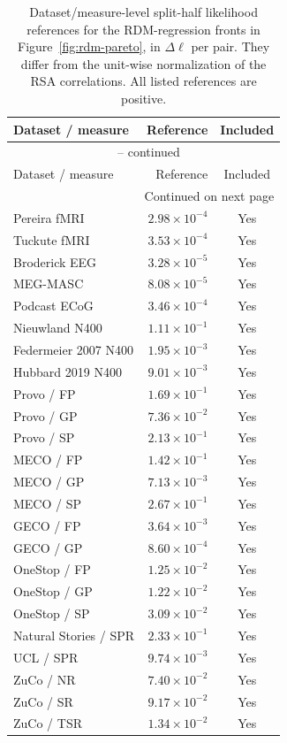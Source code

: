 {\small\setlength{\tabcolsep}{4pt}
\begin{longtable}{@{}lrc@{}}
\caption{Dataset/measure-level split-half likelihood references for the RDM-regression fronts in Figure~\ref{fig:rdm-pareto}, in $\Delta\ell$ per pair. They differ from the unit-wise normalization of the RSA correlations. All listed references are positive.}\label{tab:rdm-dll-ceilings} \\
\toprule
Dataset / measure & Reference & Included \\
\midrule
\endfirsthead
\multicolumn{3}{c}{\tablename\ \thetable{} -- continued} \\
\toprule
Dataset / measure & Reference & Included \\
\midrule
\endhead
\midrule\multicolumn{3}{r}{Continued on next page} \\
\endfoot
\bottomrule
\endlastfoot
Pereira fMRI & $2.98\times10^{-4}$ & Yes \\
Tuckute fMRI & $3.53\times10^{-4}$ & Yes \\
Broderick EEG & $3.28\times10^{-5}$ & Yes \\
MEG-MASC & $8.08\times10^{-5}$ & Yes \\
Podcast ECoG & $3.46\times10^{-4}$ & Yes \\
Nieuwland N400 & $1.11\times10^{-1}$ & Yes \\
Federmeier 2007 N400 & $1.95\times10^{-3}$ & Yes \\
Hubbard 2019 N400 & $9.01\times10^{-3}$ & Yes \\
Provo / FP & $1.69\times10^{-1}$ & Yes \\
Provo / GP & $7.36\times10^{-2}$ & Yes \\
Provo / SP & $2.13\times10^{-1}$ & Yes \\
MECO / FP & $1.42\times10^{-1}$ & Yes \\
MECO / GP & $7.13\times10^{-3}$ & Yes \\
MECO / SP & $2.67\times10^{-1}$ & Yes \\
GECO / FP & $3.64\times10^{-3}$ & Yes \\
GECO / GP & $8.60\times10^{-4}$ & Yes \\
OneStop / FP & $1.25\times10^{-2}$ & Yes \\
OneStop / GP & $1.22\times10^{-2}$ & Yes \\
OneStop / SP & $3.09\times10^{-2}$ & Yes \\
Natural Stories / SPR & $2.33\times10^{-1}$ & Yes \\
UCL / SPR & $9.74\times10^{-3}$ & Yes \\
ZuCo / NR & $7.40\times10^{-2}$ & Yes \\
ZuCo / SR & $9.17\times10^{-2}$ & Yes \\
ZuCo / TSR & $1.34\times10^{-2}$ & Yes \\
\end{longtable}
}
